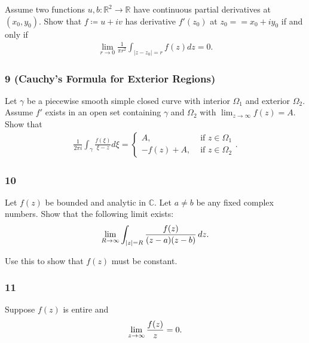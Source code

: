 Assume two functions \(u, b: {\mathbb{R}}^2 \to {\mathbb{R}}\) have
continuous partial derivatives at \((x_0 ,y_0)\). Show that
\(f \coloneqq u + iv\) has derivative \(f'(z_0)\) at
\(z_0 = =x_0 + iy_0\) if and only if
\begin{align*}
\lim _{r \rightarrow 0} \frac{1}{\pi r^{2}} \int_{\left|z-z_{0}\right|=r} f(z) d z=0
.\end{align*}

\hypertarget{cauchys-formula-for-exterior-regions}{%
\subsubsection{9 (Cauchy's Formula for Exterior
Regions)}\label{cauchys-formula-for-exterior-regions}}

Let \(\gamma\) be a piecewise smooth simple closed curve with interior
\(\Omega_1\) and exterior \(\Omega_2\). Assume \(f'\) exists in an open
set containing \(\gamma\) and \(\Omega_2\) with
\(\lim_{z\to \infty} f(z) = A\). Show that
\begin{align*}
\frac{1}{2 \pi i} \int_{\gamma} \frac{f(\xi)}{\xi-z} d \xi=\left\{\begin{array}{ll}
A, & \text { if } z \in \Omega_{1} \\
-f(z)+A, & \text { if } z \in \Omega_{2}
\end{array}\right.
.\end{align*}

\hypertarget{section-56}{%
\subsubsection{10}\label{section-56}}

Let \(f(z)\) be bounded and analytic in \({\mathbb{C}}\). Let
\(a\neq b\) be any fixed complex numbers. Show that the following limit
exists:
\begin{align*}
\lim_{R\to \infty} \int_{{\left\lvert {z} \right\rvert} = R} {f(z) \over (z-a)(z-b)} \,dz
.\end{align*}

Use this to show that \(f(z)\) must be constant.

\hypertarget{section-57}{%
\subsubsection{11}\label{section-57}}

Suppose \(f(z)\) is entire and
\begin{align*}
\lim_{z\to\infty} {f(z) \over z} = 0
.\end{align*}


